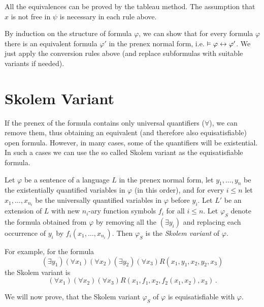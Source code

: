 All the equivalences can be proved by the tableau method. The assumption that $x$ is not free in $\psi$ is necessary in each rule above. 

By induction on the structure of formula $\varphi$, we can show that for every formula $\varphi$ there is an equivalent formula $\varphi'$ in the prenex normal form, i.e. $\vDash \varphi \leftrightarrow \varphi'$. We just apply the conversion rules above (and replace subformulas with suitable variants if needed). 

\section{Skolem Variant}

If the prenex of the formula contains only universal quantifiers ($\forall$), we can remove them, thus obtaining an equivalent (and therefore also equisatisfiable) open formula. However, in many cases, some of the quantifiers will be existential. In such a cases we can use the so called Skolem variant as the equisatisfiable formula.

Let $\varphi$ be a sentence of a language $L$ in the prenex normal form, let $y_1, \dots, y_n$ be the existentially quantified variables in $\varphi$ (in this order), and for every $i \leq n$ let $x_1, \dots, x_{n_i}$ be the universally quantified variables in $\varphi$ before $y_i$. Let $L'$ be an extension of $L$ with new $n_i$-ary function symbols $f_i$ for all $i \leq n$. Let $\varphi_S$ denote the formula obtained from $\varphi$ by removing all the $(\exists y_i)$ and replacing each occurrence of $y_i$ by $f_i(x_1, \dots, x_{n_i})$. Then $\varphi_S$ is the \emph{Skolem variant} of $\varphi$.

For example, for the formula $$(\exists y_1)(\forall x_1)(\forall x_2)(\exists y_2)(\forall x_3)R(x_1, y_1, x_2, y_2, x_3)$$ the Skolem variant is $$(\forall x_1)(\forall x_2)(\forall x_3)R(x_1, f_1, x_2, f_2(x_1, x_2), x_3)\,.$$ 


We will now prove, that the Skolem variant $\varphi_S$ of $\varphi$ is equisatisfiable with $\varphi$. 

